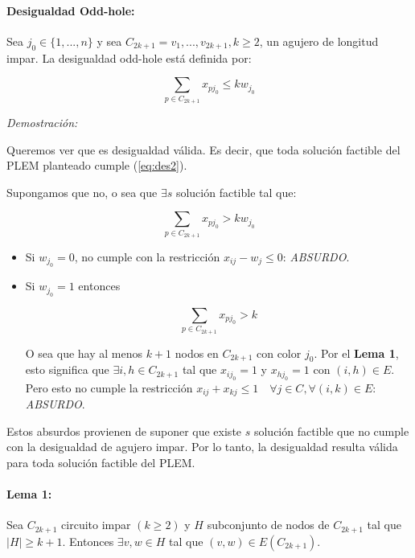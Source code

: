 \documentclass[a4paper]{article}
\begin{document}
\paragraph{Desigualdad Odd-hole:} Sea $j_0 \in \{ 1,...,n \}$ y sea $C_{2k+1} = v_1 ,..., v_{2k+1}, k \geq 2$, un agujero de longitud impar. La desigualdad odd-hole está definida por:

\begin{equation} \label{eq:des2}
\sum_{p \in C_{2k+1}} x_{pj_0} \leq kw_{j_0}
\end{equation}

{\it Demostración:}

Queremos ver que es desigualdad válida.   Es decir, que toda solución factible del PLEM planteado cumple (\ref{eq:des2}).

Supongamos que no, o sea que $\exists s$ solución factible tal que:

\begin{equation*}
\sum_{p \in C_{2k+1}} x_{pj_0} > kw_{j_0}
\end{equation*}

\begin{itemize}

	\item Si $w_{j_0} = 0$, no cumple con la restricción $x_{ij} - w_j \leq 0$: {\it ABSURDO}.
	
	\item Si $w_{j_0} = 1$ entonces
	
	\begin{equation*}
	\sum_{p \in C_{2k+1}} x_{pj_0} > k
	\end{equation*}

	O sea que hay al menos $k+1$ nodos en $C_{2k+1}$ con color $j_0$. Por el {\bf Lema 1}, esto significa que $\exists i,h \in C_{2k+1}$ tal que $x_{ij_0} =1$ y $x_{hj_0} =1$ con $(i,h) \in E$. Pero esto no cumple la restricción $x_{ij} + x_{kj} \leq 1 \quad \forall j \in C,\forall (i,k) \in E$: {\it ABSURDO}.
\end{itemize}

Estos absurdos provienen de suponer que existe $s$ solución factible que no cumple con la desigualdad de agujero impar.  Por lo tanto, la desigualdad resulta válida para toda solución factible del PLEM.

\paragraph{Lema 1:}

Sea $C_{2k+1}$ circuito impar $(k \geq 2)$ y $H$ subconjunto de nodos de $C_{2k+1}$ tal que $|H| \geq k+1$. Entonces $\exists v,w \in H$ tal que $(v,w) \in E(C_{2k+1})$.
\end{document}
